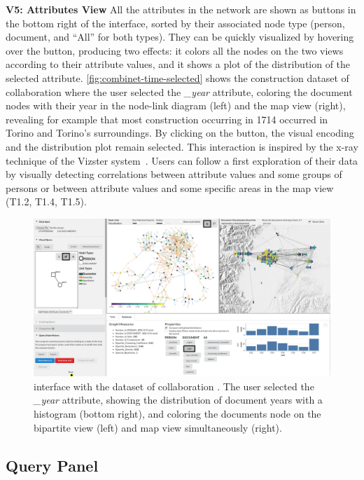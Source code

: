 \noindent\textbf{V5: Attributes View}
All the attributes in the network are shown as buttons in the bottom right of the interface, sorted by their associated node type (person, document, and ``All'' for both types).
They can be quickly visualized by hovering over the button, producing two effects: it colors all the nodes on the two views according to their attribute values, and it shows a plot of the distribution of the selected attribute. \autoref{fig:combinet-time-selected} shows the construction dataset of collaboration \pascal where the user selected the \textit{\_year} attribute, coloring the document nodes with their year in the node-link diagram (left) and the map view (right), revealing for example that most construction occurring in 1714 occurred in Torino and Torino's surroundings.
By clicking on the button, the visual encoding and the distribution plot remain selected.
 This interaction is inspired by the x-ray technique of the Vizster system~\cite{heerVizsterVisualizingOnline2005}.
Users can follow a first exploration of their data by visually detecting correlations between attribute values and some groups of persons or between attribute values and some specific areas in the map view (T1.2, T1.4, T1.5).

\begin{figure}[!ht]
 \centering
    \includegraphics[trim={15.9cm 0 0 0},clip,width=\textwidth]{static/figures/ComBiNet/Piemont_timeSelected.png}
    \caption{\name interface with the dataset of collaboration \pascal. The user selected the \textit{\_year} attribute, showing the distribution of document years with a histogram (bottom right), and coloring the documents node on the bipartite view (left) and map view simultaneously (right).}\label{fig:combinet-time-selected}
\end{figure}

\subsection{Query Panel}

